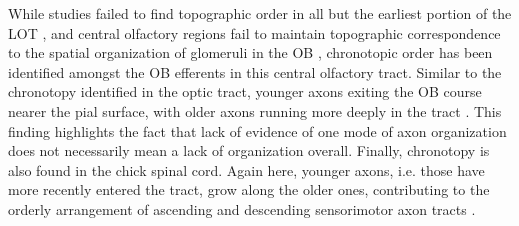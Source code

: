 While studies failed to find topographic order in all but the earliest portion of the LOT \cite{price1975observation}, and central olfactory regions fail to maintain topographic correspondence to the spatial organization of glomeruli in the OB \cite{luskin1982distribution,sosulski2011distinct}, chronotopic order has been identified amongst the OB efferents in this central olfactory tract.
Similar to the chronotopy identified in the optic tract, younger axons exiting the OB course nearer the pial surface, with older axons running more deeply in the tract \cite{yamatani2004chronotopic}. 
This finding highlights the fact that lack of evidence of one mode of axon organization does not necessarily mean a lack of organization overall.
Finally, chronotopy is also found in the chick spinal cord.
Again here, younger axons, i.e. those have more recently entered the tract, grow along the older ones, contributing to the orderly arrangement of ascending and descending sensorimotor axon tracts \cite{nornes1980pattern}.